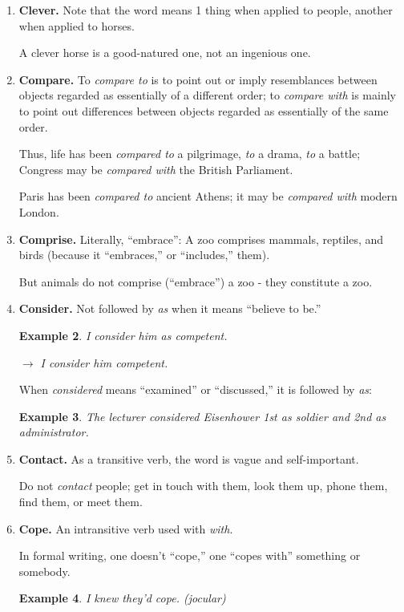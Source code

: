 \documentclass{book}
\numberwithin{equation}{section}
\newtheorem{example}{Example}[chapter]
\begin{document}
\begin{enumerate}
\begin{example}
        $\to$ He declared he knew how.
    \end{example}
    \item \textbf{Clever.} Note that the word means 1 thing when applied to people, another when applied to horses.
    
    A clever horse is a good-natured one, not an ingenious one.
    \item \textbf{Compare.} To \textit{compare to} is to point out or imply resemblances between objects regarded as essentially of a different order; to \textit{compare with} is mainly to point out differences between objects regarded as essentially of the same order.
    
    Thus, life has been \textit{compared to} a pilgrimage, \textit{to} a drama, \textit{to} a battle; Congress may be \textit{compared with} the British Parliament.
    
    Paris has been \textit{compared to} ancient Athens; it may be \textit{compared with} modern London.
    \item \textbf{Comprise.} Literally, ``embrace'': A zoo comprises mammals, reptiles, and birds (because it ``embraces,'' or ``includes,'' them).
    
    But animals do not comprise (``embrace'') a zoo - they constitute a zoo.
    \item \textbf{Consider.} Not followed by \textit{as} when it means ``believe to be.''
    \begin{example}
        I consider him as competent.
        
        $\to$ I consider him competent.
    \end{example}
    When \textit{considered} means ``examined'' or ``discussed,'' it is followed by \textit{as}:
    \begin{example}
        The lecturer considered Eisenhower 1st as soldier and 2nd as administrator.
    \end{example}
    \item \textbf{Contact.} As a transitive verb, the word is vague and self-important.
    
    Do not \textit{contact} people; get in touch with them, look them up, phone them, find them, or meet them.
    \item \textbf{Cope.} An intransitive verb used with \textit{with}.
    
    In formal writing, one doesn't ``cope,'' one ``copes with'' something or somebody.
    \begin{example}
        I knew they'd cope. (jocular)
        

\end{example}
\end{enumerate}
\end{document}
